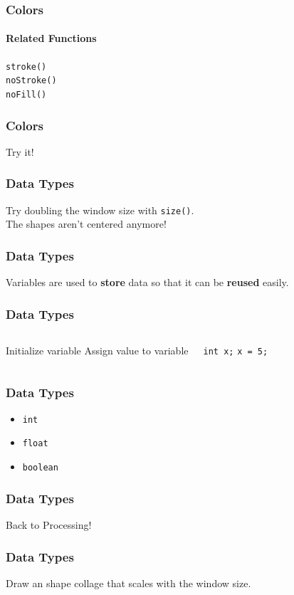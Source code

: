 \documentclass[xcolor=dvipsnames]{beamer}
\begin{document}
\begin{frame}
\frametitle{Colors}
\framesubtitle{Related Functions}
\begin{center}
{\tt stroke()} \\
{\tt noStroke()} \\
{\tt noFill()} 
\end{center}
\end{frame}

\begin{frame}
\frametitle{Colors}
\begin{center}
Try it!
\end{center}
\end{frame}

\begin{frame}
\frametitle{Data Types}
\begin{center}
Try doubling the window size with {\tt size()}. \\
\pause
The shapes aren't centered anymore!
\end{center}
\end{frame}

\begin{frame}
\frametitle{Data Types}
\begin{center}
Variables are used to {\bf store} data so that it can be {\bf reused} easily.
\end{center}
\end{frame}

\begin{frame}
\frametitle{Data Types}
\begin{columns}
\begin{block}
Initialize variable
Assign value to variable
\end{block}
\begin{block}
{\tt int x;}
{\tt x = 5;}
\end{block}
\end{columns}
\end{frame}

\begin{frame}
\frametitle{Data Types}
\begin{itemize}
\item {\tt int}
\item {\tt float}
\item {\tt boolean}
\end{itemize}
\end{frame}

\begin{frame}
\frametitle{Data Types}
\begin{center}
Back to Processing!
\end{center}
\end{frame}

\begin{frame}
\frametitle{Data Types}
\begin{center}
Draw an shape collage that scales with the window size.
\end{center}
\end{frame}
\end{document}
